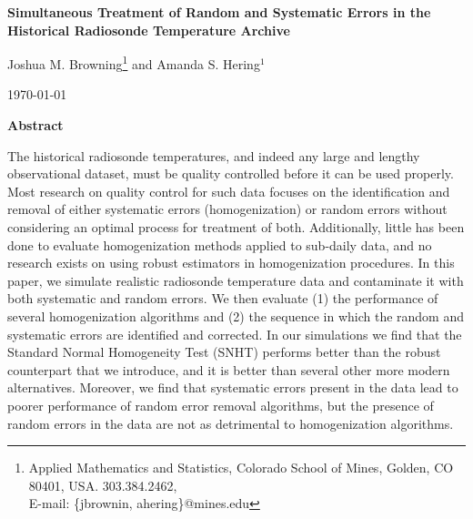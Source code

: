 \documentclass[12pt]{article}
\def\ni{\noindent}
\begin{document}
\thispagestyle{empty}
\baselineskip=28pt
\vskip 5mm
\begin{center} {\Large{\bf   Simultaneous Treatment of Random and Systematic Errors in the Historical Radiosonde Temperature Archive}}
\end{center}



\baselineskip=12pt
\vskip 5mm

\begin{center}\large
Joshua M. Browning\footnote{ \baselineskip=10pt
Applied Mathematics and Statistics, Colorado School of Mines, Golden, CO 80401,
USA. 303.384.2462, \\E-mail: \{jbrownin, ahering\}@mines.edu} and Amanda S. Hering$^1$


\end{center}

\baselineskip=17pt
\vskip 5mm
\centerline{\today}
\vskip 5mm

\begin{center}
{\large{\bf Abstract}}
\end{center}

\baselineskip=14pt

\ni  The historical radiosonde temperatures, and indeed any large and lengthy observational dataset, must be quality controlled before it can be  used properly.   Most research on quality control for such data focuses on the identification and removal of either systematic errors (homogenization) or   random errors without considering an optimal process for treatment of both.  Additionally, little has been done to evaluate  homogenization methods applied to sub-daily data, and no research exists on using robust estimators in homogenization procedures.  In this paper, we simulate realistic radiosonde temperature data and contaminate it with both systematic and random errors.  We then evaluate (1) the performance of several homogenization algorithms and (2) the sequence in which the random and systematic errors are identified and corrected.  In our simulations we find that the Standard Normal Homogeneity Test (SNHT) performs better than the robust counterpart that we introduce, and it is better than several other more modern alternatives.  Moreover, we find that systematic errors present in the data lead to poorer performance of random error removal algorithms, but the presence of random errors in the data are not as detrimental to homogenization algorithms.
\end{document}
